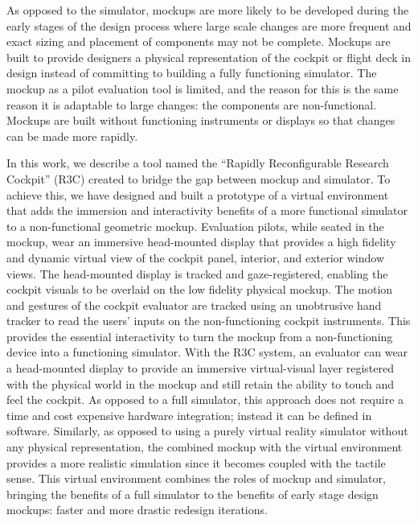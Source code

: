 As opposed to the simulator, mockups are more likely to be developed during the early stages of the design process where large scale changes are more frequent and exact sizing and placement of components may not be complete.
Mockups are built to provide designers a physical representation of the cockpit or flight deck in design instead of committing to building a fully functioning simulator.
The mockup as a pilot evaluation tool is limited, and the reason for this is the same reason it is adaptable to large changes: the components are non-functional.
Mockups are built without functioning instruments or displays so that changes can be made more rapidly.

In this work, we describe a tool named the ``Rapidly Reconfigurable Research Cockpit'' (R3C) created to bridge the gap between mockup and simulator.
To achieve this, we have designed and built a prototype of a virtual environment that adds the immersion and interactivity benefits of a more functional simulator to a non-functional geometric mockup.
 Evaluation pilots, while seated in the mockup, wear an immersive head-mounted display that provides a high fidelity and dynamic virtual view of the cockpit panel, interior, and exterior window views.
The head-mounted display is tracked and gaze-registered, enabling the cockpit visuals to be overlaid on the low fidelity physical mockup.
The motion and gestures of the cockpit evaluator are tracked using an unobtrusive hand tracker to read the users' inputs on the non-functioning cockpit instruments.
This provides the essential interactivity to turn the mockup from a non-functioning device into a functioning simulator.
With the R3C system, an evaluator can wear a head-mounted display to provide an immersive virtual-visual layer registered with the physical world in the mockup and still retain the ability to touch and feel the cockpit.
As opposed to a full simulator, this approach does not require a time and cost expensive hardware integration; instead it can be defined in software.
Similarly, as opposed to using a purely virtual reality simulator without any physical representation, the combined mockup with the virtual environment provides a more realistic simulation since it becomes coupled with the tactile sense.
This virtual environment combines the roles of mockup and simulator, bringing the benefits of a full simulator to the benefits of early stage design mockups: faster and more drastic redesign iterations.

